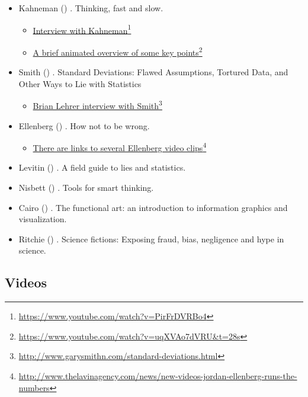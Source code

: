\documentclass[
  10ptls,
  b5paper]{book}
\providecommand{\tightlist}{%
  \setlength{\itemsep}{0pt}\setlength{\parskip}{0pt}}
\begin{document}
\begin{itemize}
\tightlist
\item
  Kahneman () . Thinking, fast and slow.

  \begin{itemize}
  \tightlist
  \item
    \href{https://www.youtube.com/watch?v=PirFrDVRBo4}{Interview with Kahneman}\footnote{\url{https://www.youtube.com/watch?v=PirFrDVRBo4}}
  \item
    \href{https://www.youtube.com/watch?v=uqXVAo7dVRU&t=28s}{A brief animated overview of some key points}\footnote{\url{https://www.youtube.com/watch?v=uqXVAo7dVRU&t=28s}}
  \end{itemize}
\item
  Smith () . Standard Deviations: Flawed Assumptions, Tortured Data, and Other Ways to Lie with Statistics

  \begin{itemize}
  \tightlist
  \item
    \href{http://www.garysmithn.com/standard-deviations.html}{Brian Lehrer interview with Smith}\footnote{\url{http://www.garysmithn.com/standard-deviations.html}}
  \end{itemize}
\item
  Ellenberg () . How not to be wrong.

  \begin{itemize}
  \tightlist
  \item
    \href{http://www.thelavinagency.com/news/new-videos-jordan-ellenberg-runs-the-numbers}{There are links to several Ellenberg video clips}\footnote{\url{http://www.thelavinagency.com/news/new-videos-jordan-ellenberg-runs-the-numbers}}
  \end{itemize}
\item
  Levitin () . A field guide to lies and statistics.
\item
  Nisbett () . Tools for smart thinking.
\item
  Cairo () . The functional art: an introduction to information
  graphics and visualization.
\item
  Ritchie () . Science fictions: Exposing fraud, bias,
  negligence and hype in science.
\end{itemize}

\subsection*{Videos}\label{videos}
\end{document}
